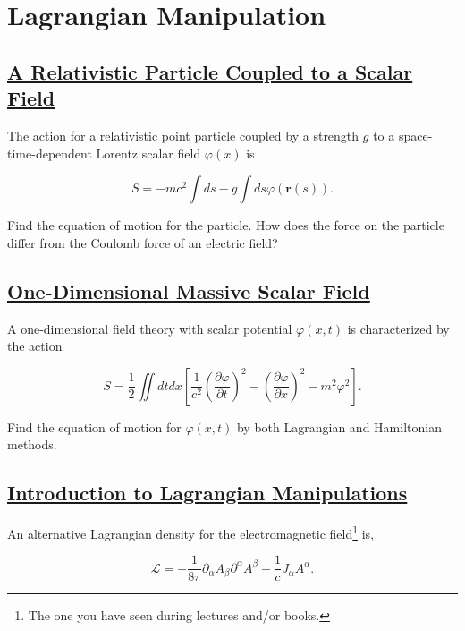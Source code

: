 \section{Lagrangian Manipulation}

\subsection{\hyperref[A Relativistic Particle Coupled to a Scalar Field]{A Relativistic Particle Coupled to a Scalar Field}}

The action for a relativistic point particle coupled by a strength $g$ to a space-time-dependent Lorentz scalar field $\varphi(x)$ is

\begin{equation}
	S=-m c^{2} \int d s-g \int d s \varphi(\mathbf{r}(s)).
\end{equation}

Find the equation of motion for the particle. How does the force on the particle differ from the Coulomb force of an electric field?

\subsection{\hyperref[One-Dimensional Massive Scalar Field]{One-Dimensional Massive Scalar Field}}

A one-dimensional field theory with scalar potential $\varphi(x, t)$ is characterized by the action

\begin{equation}
	S=\frac{1}{2} \iint d t d x\left[\frac{1}{c^{2}}\left(\frac{\partial \varphi}{\partial t}\right)^{2}-\left(\frac{\partial \varphi}{\partial x}\right)^{2}-m^{2} \varphi^{2}\right].
\end{equation}

Find the equation of motion for $\varphi(x, t)$ by both Lagrangian and Hamiltonian methods.


\subsection{\hyperref[Introduction to Lagrangian Manipulations]{Introduction to Lagrangian Manipulations}}

An alternative Lagrangian density for the electromagnetic field\footnote{The one you have seen during lectures and/or books.} is,

\begin{equation}\label{alternativelagrangian}
	\mathcal{L} = -\frac{1}{8\pi} \partial_{\alpha} A_{\beta}\partial^{\alpha} A^{\beta} - \frac{1}{c}J_{\alpha}A^{\alpha}.
\end{equation}

